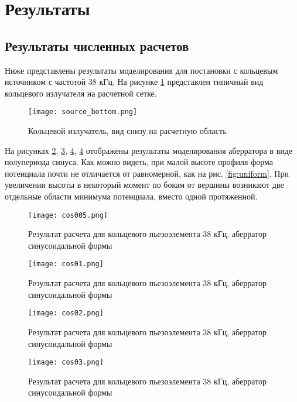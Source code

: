 \section{Результаты}
\label{sec:Chapter4} 

\subsection{Результаты численных расчетов}
Ниже представлены результаты моделирования для постановки с кольцевым источником с частотой 38 кГц. На рисунке \ref{fig:source} представлен типичный вид кольцевого излучателя на расчетной сетке.
\begin{figure}[H]
	\centering
	\texttt{[image: source\_bottom.png]}
	\caption{Кольцевой излучатель, вид снизу на расчетную область}
	\label{fig:source}
\end{figure}

На рисунках \ref{fig:cos005}, \ref{fig:cos01}, \ref{fig:cos02}, \ref{fig:cos02} отображены результаты моделирования аберратора в виде полупериода синуса. Как можно видеть, при малой высоте профиля форма потенциала почти не отличается от равномерной, как на рис. \ref{fig:uniform}. При увеличении высоты в некоторый момент по бокам от вершины возникают две отдельные области минимума потенциала, вместо одной протяженной. 

\begin{figure}[H]
	\centering
	\texttt{[image: cos005.png]}
	\caption{Результат расчета для кольцевого пьезоэлемента 38 кГц, аберратор синусоидальной формы}
	\label{fig:cos005}
\end{figure}

\begin{figure}[H]
	\centering
	\texttt{[image: cos01.png]}
	\caption{Результат расчета для кольцевого пьезоэлемента 38 кГц, аберратор синусоидальной формы}
	\label{fig:cos01}
\end{figure} 

\begin{figure}[H]
	\centering
	\texttt{[image: cos02.png]}
	\caption{Результат расчета для кольцевого пьезоэлемента 38 кГц, аберратор синусоидальной формы}
	\label{fig:cos02}
\end{figure} 

\begin{figure}[H]
	\centering
	\texttt{[image: cos03.png]}
	\caption{Результат расчета для кольцевого пьезоэлемента 38 кГц, аберратор синусоидальной формы}
	\label{fig:cos03}
\end{figure}


